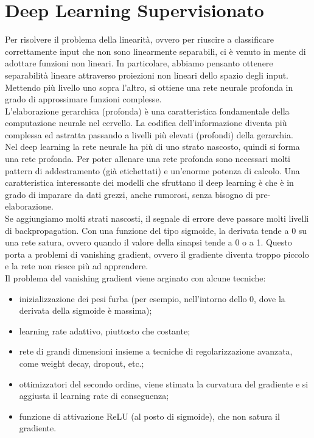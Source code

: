 \section{Deep Learning Supervisionato}

Per risolvere il problema della linearità, ovvero per riuscire a classificare
correttamente input che non sono linearmente separabili, ci è venuto in mente di
adottare funzioni non lineari. In particolare, abbiamo pensanto ottenere
separabilità lineare attraverso proiezioni non lineari dello spazio degli input.
Mettendo più livello uno sopra l'altro, si ottiene una rete neurale profonda in
grado di approssimare funzioni complesse.\\
L'elaborazione gerarchica (profonda) è una caratteristica fondamentale della
computazione neurale nel cervello. La codifica dell'informazione diventa più
complessa ed astratta passando a livelli più elevati (profondi) della
gerarchia.\\
Nel deep learning la rete neurale ha più di uno strato nascosto, quindi si forma
una rete profonda. Per poter allenare una rete profonda sono necessari molti
pattern di addestramento (già etichettati) e un'enorme potenza di calcolo. Una
caratteristica interessante dei modelli che sfruttano il deep learning è che è
in grado di imparare da dati grezzi, anche rumorosi, senza bisogno di
pre-elaborazione.\\
Se aggiungiamo molti strati nascosti, il segnale di errore deve passare molti
livelli di backpropagation. Con una funzione del tipo sigmoide, la derivata
tende a 0 su una rete satura, ovvero quando il valore della sinapsi tende a 0 o
a 1. Questo porta a problemi di vanishing gradient, ovvero il gradiente diventa
troppo piccolo e la rete non riesce più ad apprendere.\\
Il problema del vanishing gradient viene arginato con alcune tecniche:
\begin{itemize}
	\item inizializzazione dei pesi furba (per esempio, nell'intorno dello 0,
		dove la derivata della sigmoide è massima);

	\item learning rate adattivo, piuttosto che costante;

	\item rete di grandi dimensioni insieme a tecniche di regolarizzazione
		avanzata, come weight decay, dropout, etc.;

	\item ottimizzatori del secondo ordine, viene stimata la curvatura del
		gradiente e si aggiusta il learning rate di conseguenza;

	\item funzione di attivazione ReLU (al posto di sigmoide), che non satura il 
		gradiente.
\end{itemize}

